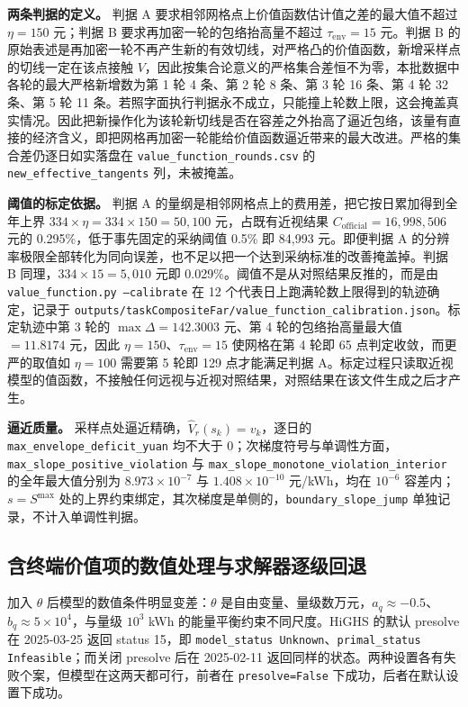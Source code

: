 \begin{appendices}
\textbf{两条判据的定义。} 判据 A 要求相邻网格点上价值函数估计值之差的最大值不超过 $\eta=150$ 元；判据 B 要求再加密一轮的包络抬高量不超过 $\tau_{\mathrm{env}}=15$ 元。判据 B 的原始表述是再加密一轮不再产生新的有效切线，对严格凸的价值函数，新增采样点的切线一定在该点接触 $V$，因此按集合论意义的严格集合差恒不为零，本批数据中各轮的最大严格新增数为第 1 轮 4 条、第 2 轮 8 条、第 3 轮 16 条、第 4 轮 32 条、第 5 轮 11 条。若照字面执行判据永不成立，只能撞上轮数上限，这会掩盖真实情况。因此把新操作化为该轮新切线是否在容差之外抬高了逼近包络，该量有直接的经济含义，即把网格再加密一轮能给价值函数逼近带来的最大改进。严格的集合差仍逐日如实落盘在 \texttt{value\_function\_rounds.csv} 的 \texttt{new\_effective\_tangents} 列，未被掩盖。

\textbf{阈值的标定依据。} 判据 A 的量纲是相邻网格点上的费用差，把它按日累加得到全年上界 $334\times\eta=334\times150=50{,}100$ 元，占既有近视结果 $C_{\mathrm{official}}=16{,}998{,}506$ 元的 0.295\%，低于事先固定的采纳阈值 0.5\% 即 84,993 元。即便判据 A 的分辨率极限全部转化为同向误差，也不足以把一个达到采纳标准的改善掩盖掉。判据 B 同理，$334\times15=5{,}010$ 元即 0.029\%。阈值不是从对照结果反推的，而是由 \texttt{value\_function.py --calibrate} 在 12 个代表日上跑满轮数上限得到的轨迹确定，记录于 \texttt{outputs/\allowbreak taskCompositeFar/\allowbreak value\_function\_calibration.json}。标定轨迹中第 3 轮的 $\max\Delta=142.3003$ 元、第 4 轮的包络抬高量最大值 $=11.8174$ 元，因此 $\eta=150$、$\tau_{\mathrm{env}}=15$ 使网格在第 4 轮即 65 点判定收敛，而更严的取值如 $\eta=100$ 需要第 5 轮即 129 点才能满足判据 A。标定过程只读取近视模型的值函数，不接触任何远视与近视对照结果，对照结果在该文件生成之后才产生。

\textbf{逼近质量。} 采样点处逼近精确，$\hat V_r(s_k)=v_k$，逐日的 \texttt{max\_envelope\_deficit\_yuan} 均不大于 0；次梯度符号与单调性方面，\texttt{max\_slope\_positive\_violation} 与 \texttt{max\_slope\_monotone\_violation\_interior} 的全年最大值分别为 $8.973\times10^{-7}$ 与 $1.408\times10^{-10}$ 元/kWh，均在 $10^{-6}$ 容差内；$s=S^{\max}$ 处的上界约束绑定，其次梯度是单侧的，\texttt{boundary\_slope\_jump} 单独记录，不计入单调性判据。

\subsection{含终端价值项的数值处理与求解器逐级回退}

加入 $\theta$ 后模型的数值条件明显变差：$\theta$ 是自由变量、量级数万元，$a_q\approx-0.5$、$b_q\approx5\times10^4$，与量级 $10^3$ kWh 的能量平衡约束不同尺度。HiGHS 的默认 presolve 在 2025-03-25 返回 status 15，即 \texttt{model\_status Unknown}、\texttt{primal\_status Infeasible}；而关闭 presolve 后在 2025-02-11 返回同样的状态。两种设置各有失败个案，但模型在这两天都可行，前者在 \texttt{presolve=False} 下成功，后者在默认设置下成功。


\end{appendices}

